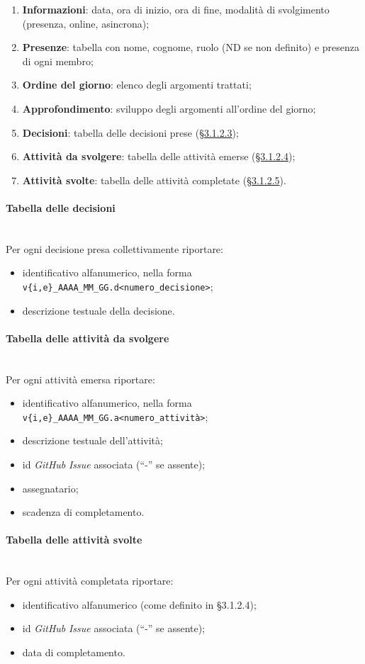 \documentclass[10pt, letterpaper]{article}
\newcommand{\trisubsection}[1]{\paragraph{#1}\mbox{}\\}
\begin{document}
\begin{enumerate}
    \item \textbf{Informazioni}: data, ora di inizio, ora di fine, modalità di svolgimento (presenza, online, asincrona);
    \item \textbf{Presenze}: tabella con nome, cognome, ruolo (ND se non definito) e presenza di ogni membro;
    \item \textbf{Ordine del giorno}: elenco degli argomenti trattati;
    \item \textbf{Approfondimento}: sviluppo degli argomenti all'ordine del giorno;
    \item \textbf{Decisioni}: tabella delle decisioni prese (\hyperref[sec:TabellaDecisioni]{§3.1.2.3});
    \item \textbf{Attività da svolgere}: tabella delle attività emerse (\hyperref[sec:TabellaToDo]{§3.1.2.4});
    \item \textbf{Attività svolte}: tabella delle attività completate (\hyperref[sec:TabellaDone]{§3.1.2.5}).
\end{enumerate}

\label{sec:TabellaDecisioni}
\trisubsection{Tabella delle decisioni}
Per ogni decisione presa collettivamente riportare:
\begin{itemize}
    \item identificativo alfanumerico, nella forma \texttt{v\{i,e\}\_AAAA\_MM\_GG.d<numero\_decisione>};
    \item descrizione testuale della decisione.
\end{itemize}

\label{sec:TabellaToDo}
\trisubsection{Tabella delle attività da svolgere}
Per ogni attività emersa riportare:
\begin{itemize}
    \item identificativo alfanumerico, nella forma \texttt{v\{i,e\}\_AAAA\_MM\_GG.a<numero\_attività>};
    \item descrizione testuale dell'attività;
    \item id \textit{GitHub} \textit{Issue} associata (``-'' se assente);
    \item assegnatario;
    \item scadenza di completamento.
\end{itemize}

\label{sec:TabellaDone}
\trisubsection{Tabella delle attività svolte}
Per ogni attività completata riportare:
\begin{itemize}
    \item identificativo alfanumerico (come definito in §3.1.2.4);
    \item id \textit{GitHub} \textit{Issue} associata (``-'' se assente);
    \item data di completamento.
\end{itemize}
\end{document}
